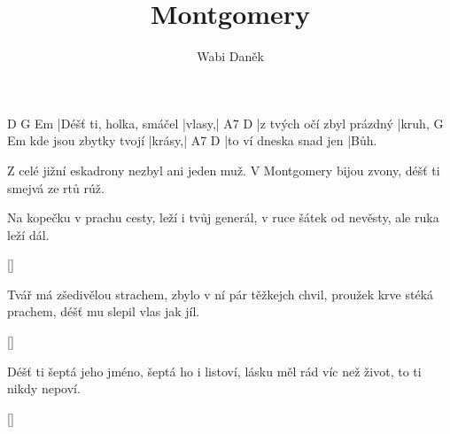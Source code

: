 \documentclass{song}
\title{Montgomery}
\author{Wabi Daněk}
\begin{document}
\strophe
D                       G      Em
|Déšť ti, holka, smáčel |vlasy,|
A7                        D
|z tvých očí zbyl prázdný |kruh,
                      G      Em
kde jsou zbytky tvojí |krásy,|
A7                     D
|to ví dneska snad jen |Bůh.
\endstrophe

Z celé jižní eskadrony
nezbyl ani jeden muž.
V Montgomery bijou zvony,
déšť ti smejvá ze rtů rúž.
\endstrophe

\strophe*
Na kopečku v prachu cesty,
leží i tvůj generál,
v ruce šátek od nevěsty,
ale ruka leží dál.
\endstrophe

\ref{}

\strophe*
Tvář má zšedivělou strachem,
zbylo v ní pár těžkejch chvil,
proužek krve stéká prachem,
déšť mu slepil vlas jak jíl.
\endstrophe

\ref{}

\strophe*
Déšť ti šeptá jeho jméno,
šeptá ho i listoví,
lásku měl rád víc než život,
to ti nikdy nepoví.
\endstrophe

\ref{}
\end{document}
